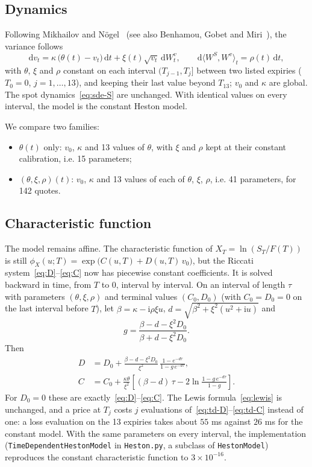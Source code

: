 \documentclass[11pt,a4paper]{article}
\theoremstyle{plain}
\theoremstyle{definition}
\newcommand{\dd}{\mathrm{d}}
\newcommand{\iu}{\mathrm{i}}
\begin{document}
\subsection{Dynamics}
Following Mikhailov and N\"ogel~\cite{mikhailov} (see also Benhamou, Gobet and Miri~\cite{hestontd}), the variance follows
\begin{equation}
    \dd v_t = \kappa\,\bigl(\theta(t) - v_t\bigr)\,\dd t + \xi(t)\sqrt{v_t}\,\dd W^v_t, \qquad \dd\langle W^S, W^v\rangle_t = \rho(t)\,\dd t,
    \label{eq:td-sde}
\end{equation}
with $\theta$, $\xi$ and $\rho$ constant on each interval $(T_{j-1},T_j]$ between two listed expiries ($T_0=0$, $j=1,\dots,13$), and keeping their last value beyond $T_{13}$; $v_0$ and $\kappa$ are global. The spot dynamics~\eqref{eq:sde-S} are unchanged. With identical values on every interval, the model is the constant Heston model.

We compare two families:
\begin{itemize}
    \item $\theta(t)$ only: $v_0$, $\kappa$ and 13 values of $\theta$, with $\xi$ and $\rho$ kept at their constant calibration, i.e. 15 parameters;
    \item $(\theta,\xi,\rho)(t)$: $v_0$, $\kappa$ and 13 values of each of $\theta$, $\xi$, $\rho$, i.e. 41 parameters, for 142 quotes.
\end{itemize}

\subsection{Characteristic function}
The model remains affine. The characteristic function of $X_T=\ln(S_T/F(T))$ is still $\phi_X(u;T)=\exp\bigl(C(u,T)+D(u,T)\,v_0\bigr)$, but the Riccati system~\eqref{eq:D}--\eqref{eq:C} now has piecewise constant coefficients. It is solved backward in time, from $T$ to $0$, interval by interval. On an interval of length $\tau$ with parameters $(\theta,\xi,\rho)$ and terminal values $(C_0,D_0)$ (with $C_0=D_0=0$ on the last interval before $T$), let $\beta=\kappa-\iu\rho\xi u$, $d=\sqrt{\beta^2+\xi^2(u^2+\iu u)}$ and
\begin{equation}
    g=\frac{\beta-d-\xi^2D_0}{\beta+d-\xi^2D_0}.
\end{equation}
Then
\begin{align}
    D &= D_0+\frac{\beta-d-\xi^2D_0}{\xi^2}\,\frac{1-e^{-d\tau}}{1-g\,e^{-d\tau}}, \label{eq:td-D}\\
    C &= C_0+\frac{\kappa\theta}{\xi^2}\left[(\beta-d)\,\tau-2\ln\frac{1-g\,e^{-d\tau}}{1-g}\right]. \label{eq:td-C}
\end{align}
For $D_0=0$ these are exactly~\eqref{eq:D}--\eqref{eq:C}. The Lewis formula~\eqref{eq:lewis} is unchanged, and a price at $T_j$ costs $j$ evaluations of~\eqref{eq:td-D}--\eqref{eq:td-C} instead of one: a loss evaluation on the 13 expiries takes about $55$ ms against $26$ ms for the constant model. With the same parameters on every interval, the implementation (\texttt{TimeDependentHestonModel} in \texttt{Heston.py}, a subclass of \texttt{HestonModel}) reproduces the constant characteristic function to $3\times10^{-16}$.
\end{document}
